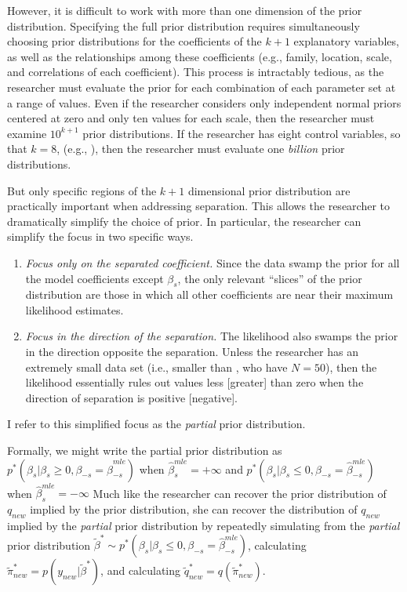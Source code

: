 \documentclass[12pt]{article}
\begin{document}
However, it is difficult to work with more than one dimension of the prior distribution. 
Specifying the full prior distribution requires simultaneously choosing prior distributions for the coefficients of the $k + 1$ explanatory variables, as well as the relationships among these coefficients (e.g., family, location, scale, and correlations of each coefficient). 
This process is intractably tedious, as the researcher must evaluate the prior for each combination of each parameter set at a range of values. 
Even if the researcher considers only independent normal priors centered at zero and only ten values for each scale, then the researcher must examine $10^{k+1}$ prior distributions. 
If the researcher has eight control variables, so that $k = 8$, (e.g., \citealt{BarrilleauxRainey2014}), then the researcher must evaluate one \emph{billion} prior distributions.

But only specific regions of the $k + 1$ dimensional prior distribution are practically important when addressing separation. 
This allows the researcher to dramatically simplify the choice of prior. 
In particular, the researcher can simplify the focus in two specific ways.
\begin{enumerate}
\item \emph{Focus only on the separated coefficient.} 
Since the data swamp the prior for all the model coefficients except $\beta_s$, the only relevant ``slices'' of the prior distribution are those in which all other coefficients are near their maximum likelihood estimates.
\item \emph{Focus in the direction of the separation.} 
The likelihood also swamps the prior in the direction opposite the separation. 
Unless the researcher has an extremely small data set (i.e., smaller than \cite{BarrilleauxRainey2014}, who have $N = 50$), then the likelihood essentially rules out values less [greater] than zero when the direction of separation is positive [negative].
\end{enumerate}
\noindent I refer to this simplified focus as the \emph{partial} prior distribution. 

Formally, we might write the partial prior distribution as $p^*(\beta_s | \beta_s \geq 0, \beta_{-s} = \hat{\beta}_{-s}^{mle})$ when $\hat{\beta}^{mle}_s = +\infty$ and $p^*(\beta_s | \beta_s \leq 0, \beta_{-s} = \hat{\beta}_{-s}^{mle})$ when $\hat{\beta}^{mle}_s = -\infty$
Much like the researcher can recover the prior distribution of $q_{new}$ implied by the prior distribution, she can recover the distribution of $q_{new}$ implied by the \textit{partial} prior distribution by repeatedly simulating from the \textit{partial} prior distribution $\tilde{\beta}^* \sim p^*(\beta_s | \beta_s \leq 0, \beta_{-s} = \hat{\beta}_{-s}^{mle})$, calculating $\tilde{\pi}^*_{new} = p(y_{new}|\tilde{\beta}^*)$, and calculating $\tilde{q}^*_{new} = q(\tilde{\pi}^*_{new})$.
\end{document}
